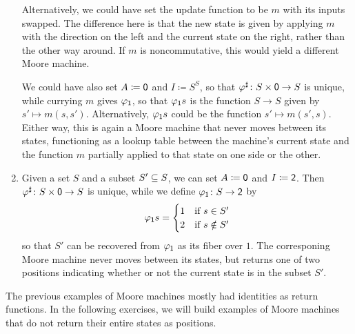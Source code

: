 \documentclass[Book-Poly]{subfiles}
\begin{document}
\begin{exercise}
\begin{solution}
\begin{enumerate}
  Alternatively, we could have set the update function to be $m$ with its inputs swapped.
  The difference here is that the new state is given by applying $m$ with the direction on the left and the current state on the right, rather than the other way around.
  If $m$ is noncommutative, this would yield a different Moore machine.

  We could have also set $A\coloneqq\0$ and $I\coloneqq S^S$, so that $\varphi^\sharp\colon S\times\0\to S$ is unique, while currying $m$ gives $\varphi_\1$, so that $\varphi_\1 s$ is the function $S \to S$ given by $s' \mapsto m(s, s')$.
  Alternatively, $\varphi_\1 s$ could be the function $s' \mapsto m(s', s)$.
  Either way, this is again a Moore machine that never moves between its states, functioning as a lookup table between the machine's current state and the function $m$ partially applied to that state on one side or the other.

  \item Given a set $S$ and a subset $S' \ss S$, we can set $A\coloneqq\0$ and $I\coloneqq\2$.
  Then $\varphi^\sharp\colon S\times\0\to S$ is unique, while we define $\varphi_\1\colon S\to\2$ by
  \[
      \varphi_\1 s =
      \begin{cases}
          1 & \text{if } s \in S' \\
          2 & \text{if } s \notin S'
      \end{cases}
  \]
  so that $S'$ can be recovered from $\varphi_\1$ as its fiber over $1$.
  The corresponing Moore machine never moves between its states, but returns one of two positions indicating whether or not the current state is in the subset $S'$.
\end{enumerate}
\end{solution}
\end{exercise}

The previous examples of Moore machines mostly had identities as return functions.
In the following exercises, we will build examples of Moore machines that do not return their entire states as positions.
\end{document}

